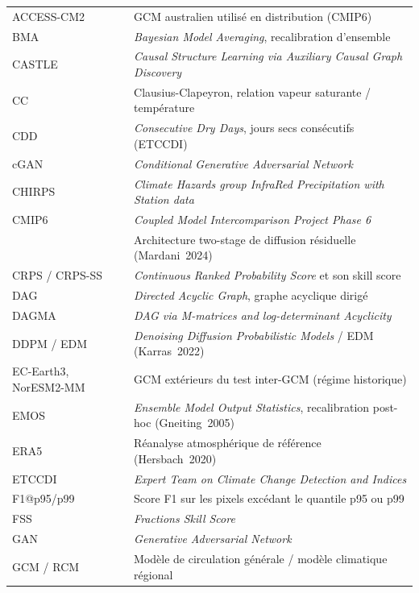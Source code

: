 \begingroup\small
\begin{longtable}{p{3.8cm} p{10.7cm}}
ACCESS-CM2 & GCM australien utilisé en distribution (CMIP6) \\[0.3em]
BMA & \emph{Bayesian Model Averaging}, recalibration d'ensemble \\[0.3em]
CASTLE & \emph{Causal Structure Learning via Auxiliary Causal Graph Discovery} \\[0.3em]
CC & Clausius-Clapeyron, relation vapeur saturante / température \\[0.3em]
CDD & \emph{Consecutive Dry Days}, jours secs consécutifs (ETCCDI) \\[0.3em]
cGAN & \emph{Conditional Generative Adversarial Network} \\[0.3em]
CHIRPS & \emph{Climate Hazards group InfraRed Precipitation with Station data} \\[0.3em]
CMIP6 & \emph{Coupled Model Intercomparison Project Phase 6} \\[0.3em]
\CorrDiff{} & Architecture two-stage de diffusion résiduelle (Mardani~2024) \\[0.3em]
CRPS / CRPS-SS & \emph{Continuous Ranked Probability Score} et son skill score \\[0.3em]
DAG & \emph{Directed Acyclic Graph}, graphe acyclique dirigé \\[0.3em]
DAGMA & \emph{DAG via M-matrices and log-determinant Acyclicity} \\[0.3em]
DDPM / EDM & \emph{Denoising Diffusion Probabilistic Models} / EDM (Karras~2022) \\[0.3em]
EC-Earth3, NorESM2-MM & GCM extérieurs du test inter-GCM (régime historique) \\[0.3em]
EMOS & \emph{Ensemble Model Output Statistics}, recalibration post-hoc (Gneiting~2005) \\[0.3em]
ERA5 & Réanalyse atmosphérique de référence (Hersbach~2020) \\[0.3em]
ETCCDI & \emph{Expert Team on Climate Change Detection and Indices} \\[0.3em]
F1@p95/p99 & Score F1 sur les pixels excédant le quantile p95 ou p99 \\[0.3em]
FSS & \emph{Fractions Skill Score} \\[0.3em]
GAN & \emph{Generative Adversarial Network} \\[0.3em]
GCM / RCM & Modèle de circulation générale / modèle climatique régional \\[0.3em]

\end{longtable}
